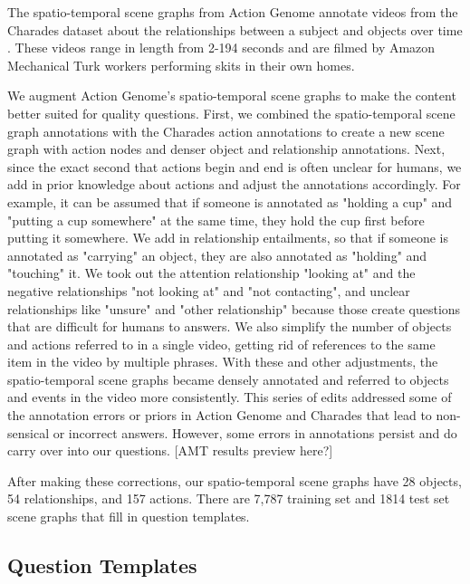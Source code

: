 \documentclass[10pt,twocolumn,letterpaper]{article}
\newcommand{\mgm}[1]{{\color{cyan}{mgm: #1}}}
\begin{document}
The spatio-temporal scene graphs from Action Genome annotate videos from the Charades dataset about the relationships between a subject and objects over time \cite{ji2020action, sigurdsson2016hollywood}. These videos range in length from 2-194 seconds and are filmed by Amazon Mechanical Turk workers performing skits in their own homes.

\mgm{Delete from this paragraph as space requires - and move to supplementary}
We augment Action Genome's spatio-temporal scene graphs to make the content better suited for quality questions. First, we combined the spatio-temporal scene graph annotations with the Charades action annotations to create a new scene graph with action nodes and denser object and relationship annotations. Next, since the exact second that actions begin and end is often unclear for humans, we add in prior knowledge about actions and adjust the annotations accordingly. For example, it can be assumed that if someone is annotated as "holding a cup" and "putting a cup somewhere" at the same time, they hold the cup first before putting it somewhere. We add in relationship entailments, so that if someone is annotated as "carrying" an object, they are also annotated as "holding" and "touching" it. We took out the attention relationship "looking at" and the negative relationships "not looking at" and "not contacting", and unclear relationships like "unsure" and "other relationship" because those create questions that are difficult for humans to answers. We also simplify the number of objects and actions referred to in a single video, getting rid of references to the same item in the video by multiple phrases. With these and other adjustments, the spatio-temporal scene graphs became densely annotated and referred to objects and events in the video more consistently. This series of edits addressed some of the annotation errors or priors in Action Genome and Charades that lead to non-sensical or incorrect answers. However, some errors in annotations persist and do carry over into our questions. [AMT results preview here?]

After making these corrections, our spatio-temporal scene graphs have 28 objects, 54 relationships, and 157 actions. There are 7,787 training set and 1814 test set scene graphs that fill in question templates.

\subsection{Question Templates}
\end{document}
